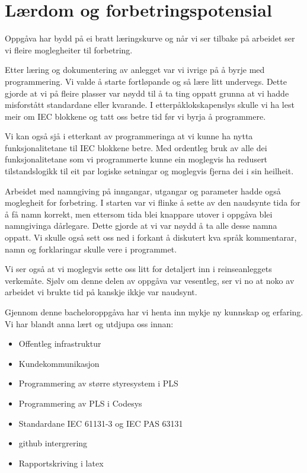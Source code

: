 \section{Lærdom og forbetringspotensial}
\thispagestyle{fancy}

Oppgåva har bydd på ei bratt læringskurve og når vi ser tilbake på arbeidet ser vi fleire moglegheiter til forbetring.

Etter læring og dokumentering av anlegget var vi ivrige på å byrje med programmering.
Vi valde å starte fortløpande og så lære litt undervegs.
Dette gjorde at vi på fleire plasser var nøydd til å ta ting oppatt grunna at vi hadde misforstått standardane eller kvarande.
I etterpåklokskapenslys skulle vi ha lest meir om \gls{IEC} blokkene og tatt oss betre tid før vi byrja å programmere.

Vi kan også sjå i etterkant av programmeringa at vi kunne ha nytta funksjonalitetane til \gls{IEC} blokkene betre.
Med ordentleg bruk av alle dei funksjonalitetane som vi programmerte kunne ein moglegvis ha redusert tilstandslogikk
til eit par logiske setningar og moglegvis fjerna dei i sin heilheit.

Arbeidet med namngiving på inngangar, utgangar og parameter hadde også moglegheit for forbetring.
I starten var vi flinke å sette av den naudsynte tida for å få namn korrekt, men ettersom tida blei knappare utover i oppgåva
blei namngivinga dårlegare. Dette gjorde at vi var nøydd å ta alle desse namna oppatt. \newline
Vi skulle også sett oss ned i forkant å diskutert kva språk kommentarar, namn og forklaringar skulle vere i programmet.

Vi ser også at vi moglegvis sette oss litt for detaljert inn i reinseanleggets verkemåte.
Sjølv om denne delen av oppgåva var vesentleg, ser vi no at noko av arbeidet vi brukte tid på kanskje ikkje var naudsynt.

Gjennom denne bacheloroppgåva har vi henta inn mykje ny kunnskap og erfaring.
Vi har blandt anna lært og utdjupa oss innan:

\begin{itemize}
    \item Offentleg infrastruktur
    \item Kundekommunikasjon
    \item Programmering av større styresystem i \gls{PLS}
    \item Programmering av \gls{PLS} i \gls{Codesys}
    \item Standardane \gls{IEC} 61131-3 og \gls{IEC} \gls{PAS} 63131
    \item \Gls{github} intergrering
    \item Rapportskriving i \gls{latex}
\end{itemize}






